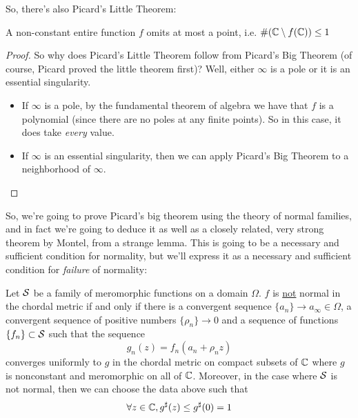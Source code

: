 \documentclass{article}
\begin{document}
So, there's also Picard's Little Theorem:
\begin{theorem}
A non-constant entire function \(f\) omits at most a point, i.e. \(\#(\mathbb{C}\setminus f(\mathbb{C})) \leq 1\)
\end{theorem}
\begin{proof}
So why does Picard's Little Theorem follow from Picard's Big Theorem (of course, Picard proved the little theorem first)? Well, either \(\infty\) is a pole or it is an essential singularity.
\begin{itemize}

  \item If \(\infty\) is a pole, by the fundamental theorem of algebra we have that \(f\) is a polynomial (since there are no poles at any finite points). So in this case, it does take \textit{every} value.

  \item If \(\infty\) is an essential singularity, then we can apply Picard's Big Theorem to a neighborhood of \(\infty\).

\end{itemize}
\end{proof}
So, we're going to prove Picard's big theorem using the theory of normal families, and in fact we're going to deduce it as well as a closely related, very strong theorem by Montel, from a strange lemma. This is going to be a necessary and sufficient condition for normality, but we'll express it as a necessary and sufficient condition for \textit{failure} of normality:
\begin{lemma}
Let \(\mathcal{S}\) be a family of meromorphic functions on a domain \(\Omega\). \(f\) is \underline{not} normal in the chordal metric if and only if there is a convergent sequence \(\{a_n\} \to a_\infty \in \Omega\), a convergent sequence of positive numbers \(\{\rho_n\} \to 0\) and a sequence of functions \(\{f_n\} \subset \mathcal{S}\) such that the sequence
\begin{equation}g_n(z) = f_n(a_n + \rho_n z)\end{equation}
converges uniformly to \(g\) in the chordal metric on compact subsets of \(\mathbb{C}\) where \(g\) is nonconstant and meromorphic on all of \(\mathbb{C}\). Moreover, in the case where \(\mathcal{S}\) is not normal, then we can choose the data above such that
\begin{equation}\forall z \in \mathbb{C}, g^\sharp(z) \leq g^\sharp(0) = 1\end{equation}
\end{lemma}
\end{document}
